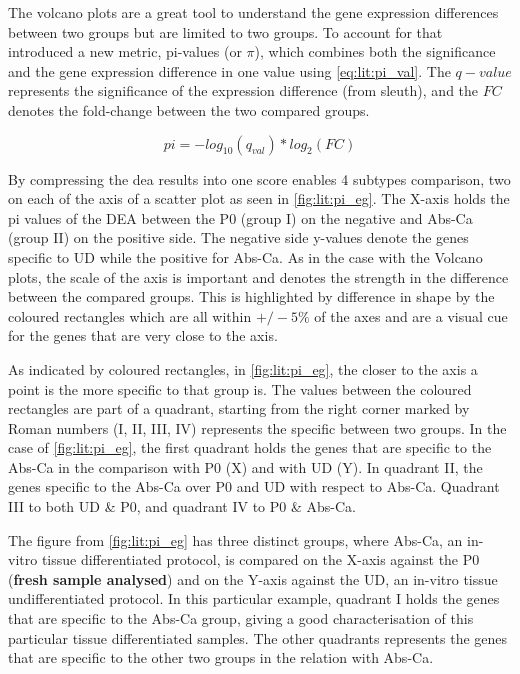 The volcano plots are a great tool to understand the gene expression differences between two groups but are limited to two groups. To account for that \citet{Xiao2014-zn} introduced a new metric, pi-values (or $\pi$), which combines both the significance and the gene expression difference in one value using \cref{eq:lit:pi_val}. The $q-value$ represents the significance of the expression difference (from sleuth), and the $FC$ denotes the fold-change between the two compared groups. 

\begin{equation} \label{eq:lit:pi_val}
    pi = - log_{10}(q_{val}) * log_{2}(FC)
\end{equation} 

By compressing the \acrshort{dea} results into one score enables 4 subtypes comparison, two on each of the axis of a scatter plot as seen in \cref{fig:lit:pi_eg}. The X-axis holds the pi values of the DEA between the P0 (group I) on the negative and Abs-Ca (group II) on the positive side. The  negative side y-values denote the genes specific to UD while the positive for Abs-Ca. As in the case with the Volcano plots, the scale of the axis is important and denotes the strength in the difference between the compared groups. This is highlighted by difference in shape by the coloured rectangles which are all within $+/-5\%$ of the axes and are a visual cue for the genes that are very close to the axis.

As indicated by coloured rectangles, in \cref{fig:lit:pi_eg}, the closer to the axis a point is the more specific to that group is. The values between the coloured rectangles are part of a quadrant, starting from the right corner marked by Roman numbers (I, II, III, IV) represents the specific between two groups. In the case of \cref{fig:lit:pi_eg}, the first quadrant holds the genes that are specific to the Abs-Ca in the comparison with P0 (X) and with UD (Y). In quadrant II, the genes specific to the Abs-Ca over P0 and UD with respect to Abs-Ca. Quadrant III to both UD \& P0, and quadrant IV to P0 \& Abs-Ca.

The figure from \cref{fig:lit:pi_eg} has three distinct groups, where Abs-Ca, an in-vitro tissue differentiated protocol, is compared on the X-axis against the P0 (\textbf{fresh sample analysed}) and on the Y-axis against the UD, an in-vitro tissue undifferentiated protocol. In this particular example, quadrant I holds the genes that are specific to the Abs-Ca group, giving a good characterisation of this particular tissue differentiated samples. The other quadrants represents the genes that are specific to the other two groups in the relation with Abs-Ca.

